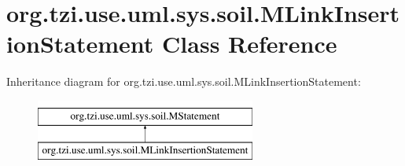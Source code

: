 \hypertarget{classorg_1_1tzi_1_1use_1_1uml_1_1sys_1_1soil_1_1_m_link_insertion_statement}{\section{org.\-tzi.\-use.\-uml.\-sys.\-soil.\-M\-Link\-Insertion\-Statement Class Reference}
\label{classorg_1_1tzi_1_1use_1_1uml_1_1sys_1_1soil_1_1_m_link_insertion_statement}
}
Inheritance diagram for org.\-tzi.\-use.\-uml.\-sys.\-soil.\-M\-Link\-Insertion\-Statement\-:\begin{figure}[H]
\begin{center}
\leavevmode
\includegraphics[height=2.000000cm]{classorg_1_1tzi_1_1use_1_1uml_1_1sys_1_1soil_1_1_m_link_insertion_statement}
\end{center}
\end{figure}

